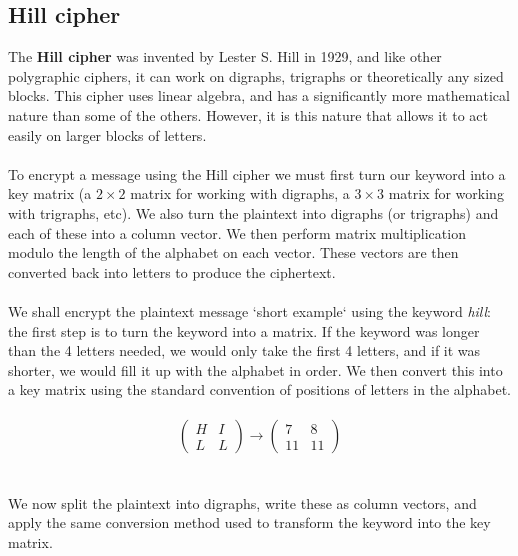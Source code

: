 \documentclass[Lau,binding=0.6cm,oneside]{sapthesis}
\begin{document}
\subsection{Hill cipher}
The \textbf{Hill cipher} was invented by Lester S. Hill in 1929, and like other polygraphic ciphers, it can work on digraphs, trigraphs or theoretically any sized blocks. This cipher uses linear algebra, and has a significantly more mathematical nature than some of the others. However, it is this nature that allows it to act easily on larger blocks of letters.\\\\
To encrypt a message using the Hill cipher we must first turn our keyword into a key matrix (a $2 \times 2$ matrix for working with digraphs, a $3 \times 3$ matrix for working with trigraphs, etc). We also turn the plaintext into digraphs (or trigraphs) and each of these into a column vector. We then perform matrix multiplication modulo the length of the alphabet on each vector. These vectors are then converted back into letters to produce the ciphertext.\\\\
We shall encrypt the plaintext message `short example` using the keyword \textit{hill}: the first step is to turn the keyword into a matrix. If the keyword was longer than the 4 letters needed, we would only take the first 4 letters, and if it was shorter, we would fill it up with the alphabet in order. We then convert this into a key matrix using the standard convention of positions of letters in the alphabet.\\\\
\begin{equation}
\begin{pmatrix}
	H & I \\
	L & L
\end{pmatrix}
\rightarrow
\begin{pmatrix}
	7 & 8\\
	11 & 11
\end{pmatrix}
\end{equation}
\ \\\\
We now split the plaintext into digraphs, write these as column vectors, and apply the same conversion method used to transform the keyword into the key matrix.\\\\
\end{document}
